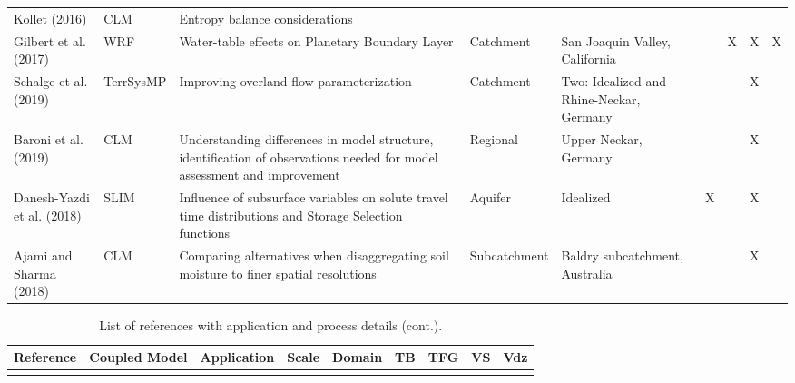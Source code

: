 {\begin{table}
\begin{tabular}{ l  p{1.5cm} p{2cm} p{1.5cm} p{1.5cm} | c | c | c | c }
\cite{Kollet2016} Kollet (2016) & CLM & Entropy balance considerations &  &  & & & & \\
\cite{Gilbert2017b} Gilbert et al. (2017) & WRF & Water-table effects on Planetary Boundary Layer & Catchment & San Joaquin Valley, California & &X &X &X \\
\cite{Schalge2019} Schalge et al. (2019) & TerrSysMP & Improving overland flow parameterization & Catchment & Two: Idealized and Rhine-Neckar, Germany & & &X & \\						
\cite{Baroni2019} Baroni et al. (2019) & CLM & Understanding differences in model structure, identification of observations needed for model assessment and improvement & Regional & Upper Neckar, Germany & & &X & \\
\cite{Danesh-Yazdi2018} Danesh-Yazdi et al. (2018) & SLIM & Influence of subsurface variables on solute travel time distributions and Storage Selection functions & Aquifer & Idealized &X & &X & \\
\cite{Ajami2018} Ajami and Sharma (2018) & CLM & Comparing alternatives when disaggregating soil moisture to finer spatial resolutions & Subcatchment & Baldry subcatchment, Australia & & &X & \\

\end{tabular}
\label{pfref14}
\end{table}


\begin{table}
\renewcommand{\arraystretch}{2.5}
\center
\caption{List of \parflow{} references with application and process details (cont.).}
\begin{tabular}{ l  p{1.5cm} p{2cm} p{1.5cm} p{1.5cm} | c | c | c | c }
\bf{Reference} & \bf{Coupled Model} & \bf{Application} & \bf{Scale} & \bf{Domain} & \bf{TB} & \bf{TFG} & \bf{VS} & \bf{Vdz} \\ 
\hline{}


\end{tabular}
\end{table}}
